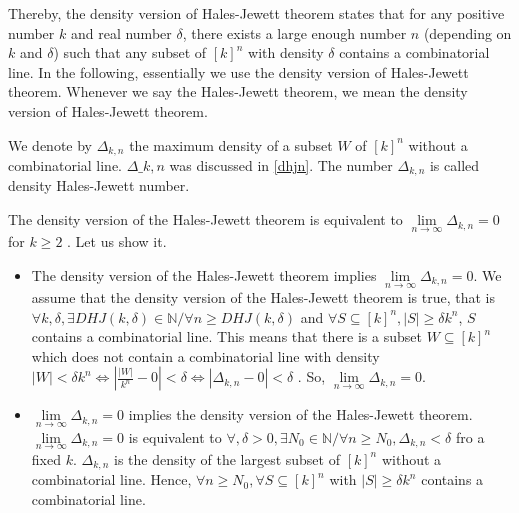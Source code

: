 Thereby, the density version of Hales-Jewett theorem states that for any positive number $k$ and real
number $\delta$,  there exists a large enough number $n$ (depending on $k$ and $\delta$) such that  any subset of  $[k]^n $ with density $\delta$ contains a combinatorial line.
In the following, essentially  we use  the density version of  Hales-Jewett theorem. Whenever we say the Hales-Jewett theorem, we mean the density version of Hales-Jewett theorem.

We denote by $\Delta_{k,n}$ the maximum density of a subset $W$ of $[k]^n$ without a combinatorial line. $\Delta\_{k,n}$
was discussed in  \eqref{dhjn}.
The number $\Delta_{k,n}$ is called density Hales-Jewett number.

The density version of the Hales-Jewett theorem is equivalent to  $\lim\limits_{n\longrightarrow \infty} \Delta_{k,n}=0$ for $k\geq 2$ \citep{furstenberg1991density}. Let us show it. \begin{itemize}
\item The density version of the Hales-Jewett theorem implies   $\lim\limits_{n\longrightarrow \infty} \Delta_{k,n}=0$. We assume that the density version of the Hales-Jewett theorem is true, that is $\forall k, \delta, \exists DHJ(k,\delta)  \in \mathbb{N} / \forall n\geq DHJ(k,\delta)$ and $\forall S \subseteq [k]^n, |S| \geq \delta k^n$, $S$ contains a combinatorial line. This means that  there is a
  subset $W \subseteq [k]^n$
  which does not contain a combinatorial line
  with density
  $|W| < \delta k^n \Longleftrightarrow |\frac{|W|}{k^n}-0| <\delta \Longleftrightarrow |\Delta_{k,n}-0|<\delta $ . So, $\lim\limits_{n\longrightarrow \infty} \Delta_{k,n}=0$.
\item $\lim\limits_{n\longrightarrow \infty} \Delta_{k,n}=0$ implies the density version of the Hales-Jewett theorem. $\lim\limits_{n\longrightarrow \infty} \Delta_{k,n}=0$ is equivalent to $\forall , \delta >0, \exists N_0 \in \mathbb{N} /\forall n \geq N_0, \Delta_{k,n} < \delta$
  fro
  a fixed $k.$ $ \Delta_{k,n}$ is the density of the largest subset of $[k]^n$ without a combinatorial line. Hence, $\forall n \geq N_0, \forall S \subseteq [k]^n$ with $|S| \geq \delta k^n$ contains a combinatorial line.
\end{itemize} 

